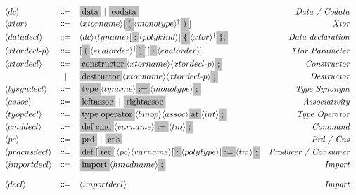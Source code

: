 \[
  \begin{array}{lclr}
    \nonterminal{dc} & \Coloneqq & \terminal{data}\ |\ \terminal{codata} & \emph{Data / Codata} \\
    \nonterminal{xtor} & \Coloneqq & \nonterminal{xtorname}[\terminal{(}\commalist{\nonterminal{monotype}}\terminal{)}] & \emph{Xtor} \\
    \nonterminal{datadecl} & \Coloneqq & \nonterminal{dc} \nonterminal{tyname} [\terminal{:} \nonterminal{polykind}] \terminal{$\{$} \commalist{\nonterminal{xtor}}\terminal{$\};$} & \emph{Data declaration} \\
    \nonterminal{xtordecl$-$p} & \Coloneqq & [\terminal{(} \commalist{\nonterminal{evalorder}} \terminal{)}] [\terminal{:} \nonterminal{evalorder}] & \emph{Xtor Parameter} \\
    \nonterminal{xtordecl} & \Coloneqq & \terminal{constructor} \nonterminal{xtorname} \nonterminal{xtordecl$-$p}\terminal{;} & \emph{Constructor} \\
    & | & \terminal{destructor} \nonterminal{xtorname}\nonterminal{xtordecl$-$p} \terminal{;} & \emph{Destructor} \\
    \nonterminal{tysyndecl} & \Coloneqq & \terminal{type} \nonterminal{tyname} \terminal{$:=$} \nonterminal{monotype}\terminal{;} & \emph{Type Synonym} \\
    \nonterminal{assoc} & \Coloneqq & \terminal{leftassoc}\ |\ \terminal{rightassoc} & \emph{Associativity} \\
    \nonterminal{tyopdecl} & \Coloneqq & \terminal{type operator} \nonterminal{binop} \nonterminal{assoc} \terminal{at} \nonterminal{int} \terminal{;} & \emph{Type Operator} \\
    \nonterminal{cmddecl} & \Coloneqq & \terminal{def cmd} \nonterminal{varname} \terminal{$:=$} \nonterminal{tm} \terminal{;} & \emph{Command} \\
    \nonterminal{pc} & \Coloneqq & \terminal{prd}\ |\ \terminal{cns} & \emph{Prd / Cns} \\
    \nonterminal{prdcnsdecl} & \Coloneqq & \terminal{def} [\terminal{rec}] \nonterminal{pc} \nonterminal{varname} [\terminal{:} \nonterminal{polytype}] \terminal{$:=$} \nonterminal{tm} \terminal{;}& \emph{Producer / Consumer} \\
    \nonterminal{importdecl} & \Coloneqq & \terminal{import} \nonterminal{hmodname}\terminal{;} & \emph{Import} \\[4mm]
    \nonterminal{decl} & \Coloneqq & \nonterminal{importdecl}  & \emph{Import} \\

\end{array}\]
